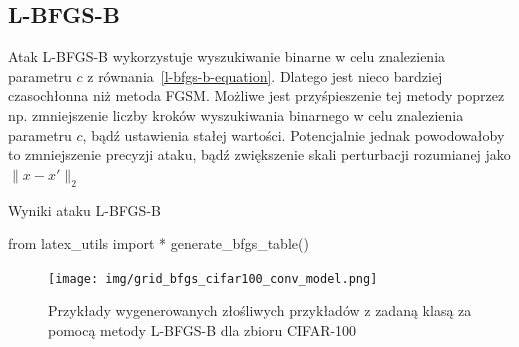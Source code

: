 \documentclass[
    left=2.5cm,         %
    right=2.5cm,        %
    top=2.5cm,          %
    bottom=3cm,         %
    bindingoffset=6mm,  %
    nohyphenation=false %
]{eiti/eiti-thesis}
\begin{document}
\subsection{L-BFGS-B}
Atak L-BFGS-B wykorzystuje wyszukiwanie binarne w celu znalezienia parametru \(c\) z równania~\ref{l-bfgs-b-equation}.
Dlatego jest nieco bardziej czasochłonna niż metoda FGSM. Możliwe jest przyśpieszenie tej metody poprzez np.
zmniejszenie liczby kroków wyszukiwania binarnego w celu znalezienia parametru \(c\), bądź ustawienia stałej wartości.
Potencjalnie jednak powodowałoby to zmniejszenie precyzji ataku, bądź zwiększenie skali perturbacji rozumianej jako
\(\|x-x'\|_2\)

\begin{table}[H]
\caption{Wyniki ataku L-BFGS-B}
\begin{adjustbox}{max width=\textwidth}
\begin{pycode}
from latex_utils import *
generate_bfgs_table()
\end{pycode}
\end{adjustbox}
\end{table}

\begin{figure}[H]


        \texttt{[image: img/grid\_bfgs\_cifar100\_conv\_model.png]}
        \caption{Przykłady wygenerowanych złośliwych przykładów z zadaną klasą za pomocą metody L-BFGS-B dla zbioru CIFAR-100}
        \label{fig:cifar100_grid_bfgs}

\end{figure}
\end{document}
